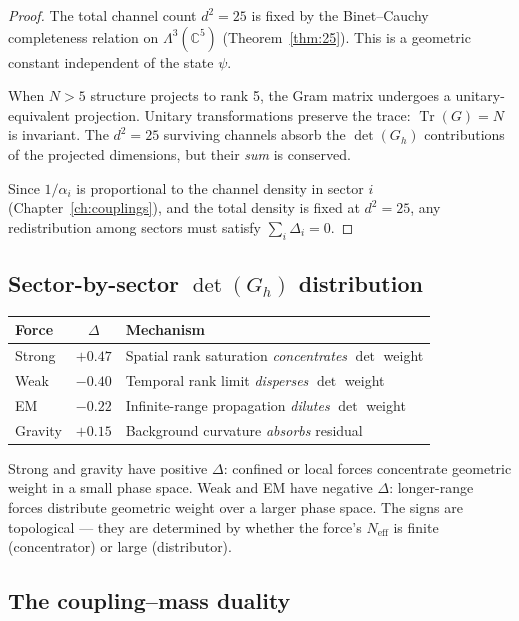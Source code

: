 \documentclass[12pt]{article}
\theoremstyle{remark}
\theoremstyle{definition}
\newcommand{\CC}{\mathbb{C}}
\begin{document}
\begin{proof}
The total channel count $d^2 = 25$ is fixed by the Binet--Cauchy completeness relation on $\Lambda^3(\CC^5)$ (Theorem~\ref{thm:25}). This is a geometric constant independent of the state $\psi$.

When $N > 5$ structure projects to rank 5, the Gram matrix undergoes a unitary-equivalent projection. Unitary transformations preserve the trace: $\operatorname{Tr}(G) = N$ is invariant. The $d^2 = 25$ surviving channels absorb the $\det(G_h)$ contributions of the projected dimensions, but their \emph{sum} is conserved.

Since $1/\alpha_i$ is proportional to the channel density in sector $i$ (Chapter~\ref{ch:couplings}), and the total density is fixed at $d^2 = 25$, any redistribution among sectors must satisfy $\sum_i \Delta_i = 0$.
\end{proof}

\subsection{Sector-by-sector $\det(G_h)$ distribution}

\begin{center}
\begin{tabular}{lcl}
\hline
Force & $\Delta$ & Mechanism \\
\hline
Strong & $+0.47$ & Spatial rank saturation \emph{concentrates} $\det$ weight \\
Weak & $-0.40$ & Temporal rank limit \emph{disperses} $\det$ weight \\
EM & $-0.22$ & Infinite-range propagation \emph{dilutes} $\det$ weight \\
Gravity & $+0.15$ & Background curvature \emph{absorbs} residual \\
\hline
\end{tabular}
\end{center}

Strong and gravity have positive $\Delta$: confined or local forces concentrate geometric weight in a small phase space. Weak and EM have negative $\Delta$: longer-range forces distribute geometric weight over a larger phase space. The signs are topological --- they are determined by whether the force's $N_\text{eff}$ is finite (concentrator) or large (distributor).

\subsection{The coupling--mass duality}
\end{document}

